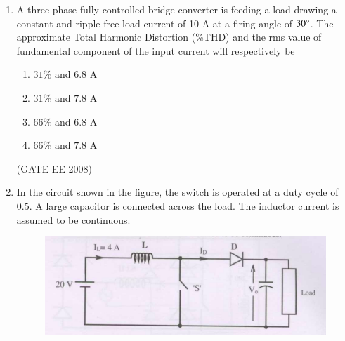 \documentclass[journal,12pt,onecolumn]{IEEEtran}
\theoremstyle{remark}
\begin{document}
\begin{enumerate}[start=1, label=Q.\arabic*]
Assume that the load inductance is sufficient to ensure continuous and ripple free load current. The firing angle of the bridge for a load current of $I_o = 10$ A will be

\begin{multicols}{4}
\begin{enumerate}
    \item $44\degree$
    \item $51\degree$
    \item $129\degree$
    \item $136\degree$
\end{enumerate}
\end{multicols}
\hfill (GATE EE 2008)



\item A three phase fully controlled bridge converter is feeding a load drawing a constant and ripple free load current of 10 A at a firing angle of $30\degree$. The approximate Total Harmonic Distortion (\%THD) and the rms value of fundamental component of the input current will respectively be

\begin{multicols}{4}
\begin{enumerate}
    \item $31\%$ and $6.8$ A
    \item $31\%$ and $7.8$ A
    \item $66\%$ and $6.8$ A
    \item $66\%$ and $7.8$ A
\end{enumerate}
\end{multicols}
\hfill (GATE EE 2008)


\item In the circuit shown in the figure, the switch is operated at a duty cycle of $0.5$. A large capacitor is connected across the load. The inductor current is assumed to be continuous.

\begin{figure}[H]
    \centering
    \includegraphics[width=\columnwidth]{Fig/q64.png}
    \caption{}
\end{figure}


\end{enumerate}
\end{document}

